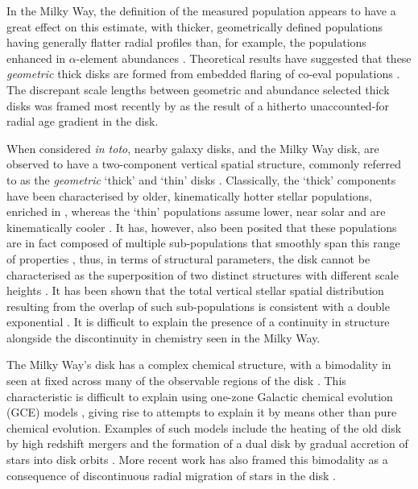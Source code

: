 In the Milky Way, the definition of the measured population appears to have a great effect on this estimate, with thicker, geometrically defined populations having generally flatter radial profiles \citep[e.g.][]{2008ApJ...673..864J} than, for example, the populations enhanced in $\alpha$-element abundances \citep[e.g.][]{2012ApJ...752...51C,2012ApJ...753..148B,2016ApJ...823...30B}. Theoretical results have suggested that these \emph{geometric} thick disks are formed from embedded flaring of co-eval populations  \citep{2015ApJ...804L...9M}. The discrepant scale lengths between geometric and abundance selected thick disks was framed most recently by \citet{2016arXiv160901168M} as the result of a hitherto unaccounted-for radial age gradient in the disk.

When considered \emph{in toto}, nearby galaxy disks, and the Milky Way disk, are observed to have a two-component vertical spatial structure, commonly referred to as the \emph{geometric} `thick' and `thin' disks \citep{1979ApJ...234..842T,1979ApJ...234..829B,1982PASJ...34..365Y,1983MNRAS.202.1025G,2008ApJ...673..864J}. Classically, the `thick' components have been characterised by older, kinematically hotter stellar populations, enriched in \afe{}, whereas the `thin' populations assume lower, near solar \afe{} and are kinematically cooler \citep[e.g.][]{2005A&A...433..185B}. It has, however, also been posited that these populations are in fact composed of multiple sub-populations that smoothly span this range of properties \citep[e.g.][]{1987ApJ...314L..39N,1991PASP..103...95N,2012ApJ...755..115B,2012ApJ...753..148B,2016ApJ...823...30B}, thus, in terms of structural parameters, the disk cannot be characterised as the superposition of two distinct structures with different scale heights \citep{2012ApJ...751..131B}. It has been shown  that the total vertical stellar spatial distribution resulting from the overlap of such sub-populations is consistent with a double exponential \citep[see, e.g., Figure 14 of][]{2013A&ARv..21...61R}. It is difficult to explain the presence of a continuity in structure alongside the discontinuity in chemistry seen in the Milky Way.

The Milky Way's disk has a complex chemical structure, with a bimodality in \afe{} seen at fixed \feh{} across many of the observable regions of the disk \citep{2003A&A...410..527B,2005A&A...433..185B,2014ApJ...796...38N,2015ApJ...808..132H}. This characteristic is difficult to explain using one-zone Galactic chemical evolution (GCE) models \citep[most recently shown by][]{2016arXiv160408613A}, giving rise to attempts to explain it by means other than pure chemical evolution. Examples of such models include the heating of the old disk by high redshift mergers \citep[e.g.][]{2004ApJ...612..894B,2008MNRAS.391.1806V,2009ApJ...700.1896K,2013A&A...558A...9M} and the formation of a dual disk by gradual accretion of stars into disk orbits \citep[e.g.][]{2003ApJ...597...21A}. More recent work has also framed this bimodality as a consequence of discontinuous radial migration of stars in the disk \citep{2016arXiv161009869T}. 

